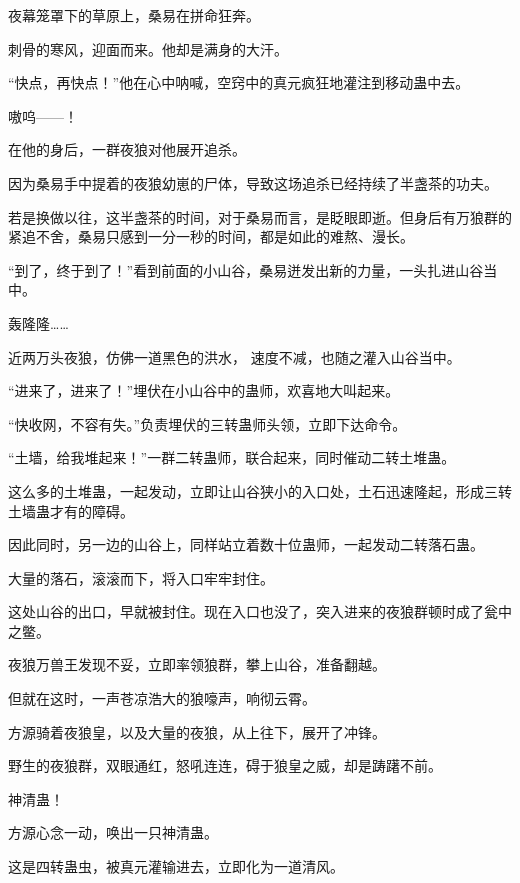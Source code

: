 
\begin{this_body}



夜幕笼罩下的草原上，桑易在拼命狂奔。

刺骨的寒风，迎面而来。他却是满身的大汗。

“快点，再快点！”他在心中呐喊，空窍中的真元疯狂地灌注到移动蛊中去。

嗷呜——！

在他的身后，一群夜狼对他展开追杀。

因为桑易手中提着的夜狼幼崽的尸体，导致这场追杀已经持续了半盏茶的功夫。

若是换做以往，这半盏茶的时间，对于桑易而言，是眨眼即逝。但身后有万狼群的紧追不舍，桑易只感到一分一秒的时间，都是如此的难熬、漫长。

“到了，终于到了！”看到前面的小山谷，桑易迸发出新的力量，一头扎进山谷当中。

轰隆隆……

近两万头夜狼，仿佛一道黑色的洪水，  速度不减，也随之灌入山谷当中。

“进来了，进来了！”埋伏在小山谷中的蛊师，欢喜地大叫起来。

“快收网，不容有失。”负责埋伏的三转蛊师头领，立即下达命令。

“土墙，给我堆起来！”一群二转蛊师，联合起来，同时催动二转土堆蛊。

这么多的土堆蛊，一起发动，立即让山谷狭小的入口处，土石迅速隆起，形成三转土墙蛊才有的障碍。

因此同时，另一边的山谷上，同样站立着数十位蛊师，一起发动二转落石蛊。

大量的落石，滚滚而下，将入口牢牢封住。

这处山谷的出口，早就被封住。现在入口也没了，突入进来的夜狼群顿时成了瓮中之鳖。

夜狼万兽王发现不妥，立即率领狼群，攀上山谷，准备翻越。

但就在这时，一声苍凉浩大的狼嚎声，响彻云霄。

方源骑着夜狼皇，以及大量的夜狼，从上往下，展开了冲锋。

野生的夜狼群，双眼通红，怒吼连连，碍于狼皇之威，却是踌躇不前。

神清蛊！

方源心念一动，唤出一只神清蛊。

这是四转蛊虫，被真元灌输进去，立即化为一道清风。


\end{this_body}
